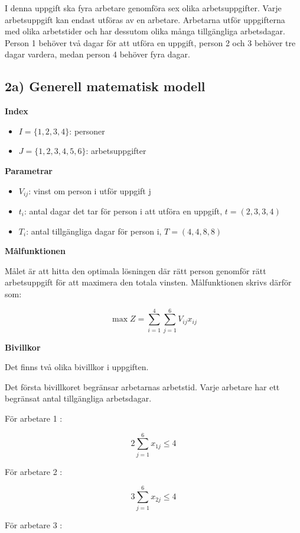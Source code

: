 \documentclass[11pt]{article}
\providecommand{\tightlist}{%
      \setlength{\itemsep}{0pt}\setlength{\parskip}{0pt}}
\begin{document}
I denna uppgift ska fyra arbetare genomföra sex olika arbetsuppgifter.
Varje arbetsuppgift kan endast utföras av en arbetare. Arbetarna utför
uppgifterna med olika arbetstider och har dessutom olika många
tillgängliga arbetsdagar. Person 1 behöver två dagar för att utföra en
uppgift, person 2 och 3 behöver tre dagar vardera, medan person 4
behöver fyra dagar.

\subsection{2a) Generell matematisk
modell}\label{a-generell-matematisk-modell}

\textbf{Index}

\begin{itemize}
\tightlist
\item
  \(I = \{1,2,3,4\}\): personer
\item
  \(J = \{1,2,3,4,5,6\}\): arbetsuppgifter
\end{itemize}

\textbf{Parametrar}

\begin{itemize}
\tightlist
\item
  \(V_{ij}\): vinst om person i utför uppgift j
\item
  \(t_i\): antal dagar det tar för person i att utföra en uppgift,
  \(t = (2, 3, 3, 4)\)
\item
  \(T_i\): antal tillgängliga dagar för person i, \(T = (4, 4, 8, 8)\)
\end{itemize}

\textbf{Målfunktionen}

Målet är att hitta den optimala lösningen där rätt person genomför rätt
arbetsuppgift för att maximera den totala vinsten. Målfunktionen skrivs
därför som:

\[
\max Z = \sum_{i=1}^{4}\sum_{j=1}^{6} V_{ij}x_{ij} \tag{7}\]

\textbf{Bivillkor}

Det finns två olika bivillkor i uppgiften.

Det första bivillkoret begränsar arbetarnas arbetstid. Varje arbetare
har ett begränsat antal tillgängliga arbetsdagar.

För arbetare 1 :

\[
2\sum_{j=1}^{6}x_{1j}\leq 4 \tag{8}\]

För arbetare 2 :

\[
3\sum_{j=1}^{6}x_{2j}\leq 4 \tag{9}\]

För arbetare 3 :
\end{document}
